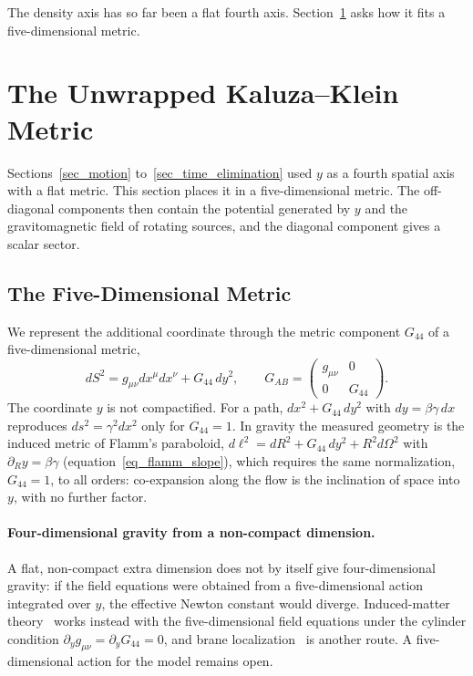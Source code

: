 \documentclass{iopjournal}
\begin{document}
The density axis has so far been a flat fourth axis. Section~\ref{sec_kk} asks how it fits a five-dimensional metric.
\section{The Unwrapped Kaluza--Klein Metric}\label{sec_kk}

Sections~\ref{sec_motion} to~\ref{sec_time_elimination} used $y$ as a fourth spatial axis with a flat metric. This section places it in a five-dimensional metric. The off-diagonal components then contain the potential generated by $y$ and the gravitomagnetic field of rotating sources, and the diagonal component gives a scalar sector.

\subsection{The Five-Dimensional Metric}

We represent the additional coordinate through the metric component $G_{44}$ of a five-dimensional metric,
\begin{equation}\label{eq_kk_line_element}
    dS^2=g_{\mu\nu}dx^\mu dx^\nu+G_{44}\,dy^2,
    \qquad
    G_{AB}=\begin{pmatrix} g_{\mu\nu} & 0\\ 0 & G_{44}\end{pmatrix}.
\end{equation}
The coordinate $y$ is not compactified. For a path, $dx^2+G_{44}\,dy^2$ with $dy=\beta\gamma\,dx$ reproduces $ds^2=\gamma^2dx^2$ only for $G_{44}=1$. In gravity the measured geometry is the induced metric of Flamm's paraboloid, $d\ell^2=dR^2+G_{44}\,dy^2+R^2d\Omega^2$ with $\partial_Ry=\beta\gamma$ (equation~\eqref{eq_flamm_slope}), which requires the same normalization, $G_{44}=1$, to all orders: co-expansion along the flow is the inclination of space into $y$, with no further factor.

\paragraph{Four-dimensional gravity from a non-compact dimension.} A flat, non-compact extra dimension does not by itself give four-dimensional gravity: if the field equations were obtained from a five-dimensional action integrated over $y$, the effective Newton constant would diverge. Induced-matter theory~\cite{Wesson1999STM,OverduinWesson1997} works instead with the five-dimensional field equations under the cylinder condition $\partial_y g_{\mu\nu}=\partial_y G_{44}=0$, and brane localization~\cite{RandallSundrum1999} is another route. A five-dimensional action for the model remains open.
\end{document}
